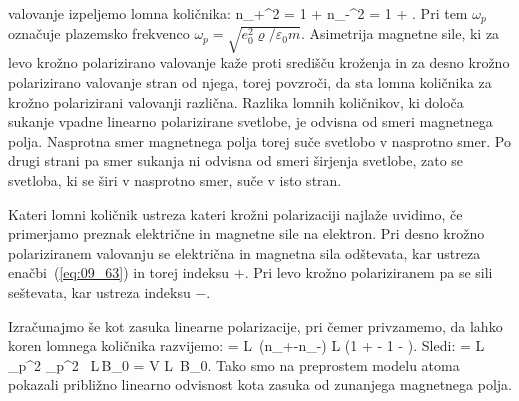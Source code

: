 valovanje izpeljemo lomna količnika:
\beq
n_+^2 = 1 +  \qquad {}
\qquad 
n_-^2 = 1 + .
\label{eq:09_66}
\eeq
Pri tem $\omega_p$ označuje plazemsko frekvenco $\omega_p = \sqrt{e_0^2 \varrho/\varepsilon_0 m}$. 
Asimetrija magnetne sile, ki za levo krožno polarizirano valovanje kaže proti
središču kroženja in za desno krožno polarizirano valovanje stran od njega, 
torej povzroči, da sta lomna količnika za krožno polarizirani valovanji različna. 
Razlika lomnih količnikov, ki določa sukanje vpadne linearno polarizirane svetlobe,
je odvisna od smeri magnetnega polja. Nasprotna smer magnetnega polja torej suče svetlobo
v nasprotno smer. Po drugi strani pa smer sukanja ni odvisna od smeri širjenja svetlobe, 
zato se svetloba, ki se širi v nasprotno smer, suče v isto stran.

Kateri lomni količnik ustreza kateri krožni polarizaciji najlaže uvidimo, če primerjamo
preznak električne in magnetne sile na elektron. Pri desno krožno polariziranem 
valovanju se električna in magnetna sila odštevata, kar ustreza enačbi~(\ref{eq:09_63})
in torej indeksu $+$. Pri levo krožno polariziranem pa se sili seštevata, kar ustreza
indeksu $-$.

Izračunajmo še kot zasuka linearne polarizacije,  pri čemer
privzamemo, da lahko koren lomnega količnika razvijemo:
\beq
\Delta \varphi = \frac{\pi}{\lambda} L~(n_+-n_-) \approx \frac{\pi}{\lambda} L
\left(1 + - 
1 - \right)\!\!.
\eeq
Sledi:
\beq
\Delta \varphi = \frac{\pi}{\lambda} L \omega_p^2
\approx \frac{\pi}{\lambda} \omega_p^2 ~L\,B_0
= V L~B_0.
\eeq
Tako smo na preprostem modelu atoma pokazali približno linearno odvisnost kota zasuka od zunanjega 
magnetnega polja.
